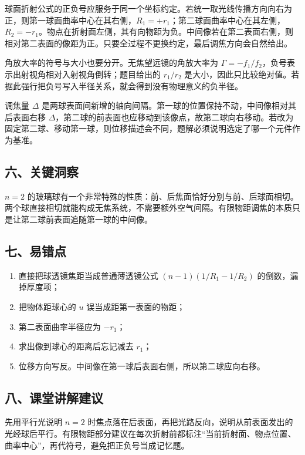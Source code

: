 \documentclass[12pt,a4paper,UTF8]{ctexart}
\newcommand{\tightlist}{\setlength{\itemsep}{0pt}\setlength{\parskip}{0pt}}
\begin{document}
球面折射公式的正负号应服务于同一个坐标约定。若统一取光线传播方向向右为正，则第一球面曲率中心在其右侧，\(R_1=+r_1\)；第二球面曲率中心在其左侧，\(R_2=-r_1\)。物点在折射面左侧，其有向物距为负。中间像若在第二表面右侧，则相对第二表面的像距为正。只要全过程不更换约定，最后调焦方向会自然给出。

角放大率的符号与大小也要分开。无焦望远镜的角放大率为
\(\Gamma=-f_1/f_2\)，负号表示出射视角相对入射视角倒转；题目给出的
\(r_1/r_2\)
是大小，因此只比较绝对值。若据此强行把负号写入半径关系，就会得到没有物理意义的负半径。

调焦量 \(\Delta\)
是两球表面间新增的轴向间隔。第一球的位置保持不动，中间像相对其后表面右移
\(\Delta\)，第二球的前表面也应移动到该像点，故第二球向右移动。若改为固定第二球、移动第一球，则位移描述会不同，题解必须说明选定了哪一个元件作为基准。

\subsection{六、关键洞察}\label{ux516dux5173ux952eux6d1eux5bdf-3}

\(n=2\)
的玻璃球有一个非常特殊的性质：前、后焦面恰好分别与前、后球面相切。两个球直接相切就能构成无焦系统，不需要额外空气间隔。有限物距调焦的本质只是让第二球前表面追随第一球的中间像。

\subsection{七、易错点}\label{ux4e03ux6613ux9519ux70b9-3}

\begin{enumerate}
\def\labelenumi{\arabic{enumi}.}
\tightlist
\item
  直接把球透镜焦距当成普通薄透镜公式 \((n-1)(1/R_1-1/R_2)\)
  的倒数，漏掉厚度项；
\item
  把物体距球心的 \(u\) 误当成距第一表面的物距；
\item
  第二表面曲率半径应为 \(-r_1\)；
\item
  求出像到球心的距离后忘记减去 \(r_1\)；
\item
  位移方向写反。中间像在第一球后表面右侧，所以第二球应向右移。
\end{enumerate}

\subsection{八、课堂讲解建议}\label{ux516bux8bfeux5802ux8bb2ux89e3ux5efaux8bae-3}

先用平行光说明 \(n=2\)
时焦点落在后表面，再把光路反向，说明从前表面发出的光经球后平行。有限物距部分建议在每次折射前都标注``当前折射面、物点位置、曲率中心''，再代符号，避免把正负号当成记忆题。
\end{document}
